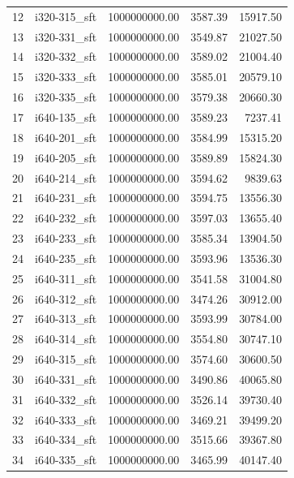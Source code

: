 \begin{tabular}{llrrr}
12 &  i320-315\_sft & 1000000000.00 &           3587.39 &    15917.50 \\
13 &  i320-331\_sft & 1000000000.00 &           3549.87 &    21027.50 \\
14 &  i320-332\_sft & 1000000000.00 &           3589.02 &    21004.40 \\
15 &  i320-333\_sft & 1000000000.00 &           3585.01 &    20579.10 \\
16 &  i320-335\_sft & 1000000000.00 &           3579.38 &    20660.30 \\
17 &  i640-135\_sft & 1000000000.00 &           3589.23 &     7237.41 \\
18 &  i640-201\_sft & 1000000000.00 &           3584.99 &    15315.20 \\
19 &  i640-205\_sft & 1000000000.00 &           3589.89 &    15824.30 \\
20 &  i640-214\_sft & 1000000000.00 &           3594.62 &     9839.63 \\
21 &  i640-231\_sft & 1000000000.00 &           3594.75 &    13556.30 \\
22 &  i640-232\_sft & 1000000000.00 &           3597.03 &    13655.40 \\
23 &  i640-233\_sft & 1000000000.00 &           3585.34 &    13904.50 \\
24 &  i640-235\_sft & 1000000000.00 &           3593.96 &    13536.30 \\
25 &  i640-311\_sft & 1000000000.00 &           3541.58 &    31004.80 \\
26 &  i640-312\_sft & 1000000000.00 &           3474.26 &    30912.00 \\
27 &  i640-313\_sft & 1000000000.00 &           3593.99 &    30784.00 \\
28 &  i640-314\_sft & 1000000000.00 &           3554.80 &    30747.10 \\
29 &  i640-315\_sft & 1000000000.00 &           3574.60 &    30600.50 \\
30 &  i640-331\_sft & 1000000000.00 &           3490.86 &    40065.80 \\
31 &  i640-332\_sft & 1000000000.00 &           3526.14 &    39730.40 \\
32 &  i640-333\_sft & 1000000000.00 &           3469.21 &    39499.20 \\
33 &  i640-334\_sft & 1000000000.00 &           3515.66 &    39367.80 \\
34 &  i640-335\_sft & 1000000000.00 &           3465.99 &    40147.40 \\
\bottomrule
\end{tabular}
